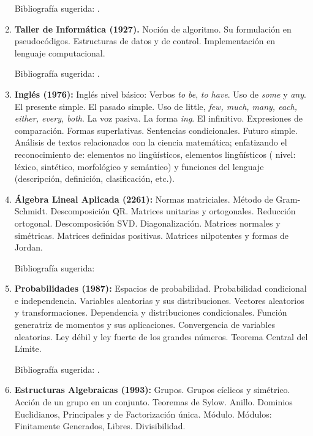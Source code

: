 \documentclass[a4paper, 12pt]{article}
\begin{document}
\begin{enumerate}
Bibliografía sugerida: \cite{ marsdentromba,MarianoGiaquinta641,ErnstHairer633,PeterD.Lax632}.


\item \textbf{Taller de Informática (1927).} Noción de algoritmo. Su formulación en pseudocódigos. Estructuras de datos y de control. Implementación
en lenguaje computacional.

Bibliografía sugerida: \cite{Seroul:2000,Rose:2015}.









\item\textbf{Inglés (1976):} Inglés nivel básico: Verbos \emph{to be}, \emph{to
have}. Uso de \emph{some} y \emph{any}. El presente simple. El
pasado simple. Uso de little, \emph{few, much, many, each, either,
every, both}. La voz pasiva. La forma \emph{ing}. El infinitivo.
Expresiones de comparación. Formas superlativas. Sentencias
condicionales. Futuro simple.  Análisis de textos relacionados con la
ciencia matemática; enfatizando el reconocimiento de: elementos no
ling\"{u}ísticos, elementos ling\"{u}ísticos ( nivel: léxico,
sintético, morfológico y semántico) y funciones del lenguaje
(descripción, definición, clasificación, etc.).


\item\textbf{Álgebra Lineal Aplicada (2261):}  Normas matriciales.
Método de Gram-Schmidt. Descomposición QR.
Matrices unitarias y ortogonales. Reducción ortogonal.
Descomposición SVD. Diagonalización. Matrices normales y simétricas. Matrices
definidas positivas. Matrices nilpotentes y formas de Jordan.

 Bibliografía sugerida: \cite{golub,hoffman,meyer, strang}


\item \textbf{Probabilidades (1987):} Espacios de probabilidad.  Probabilidad
condicional e independencia.  Variables aleatorias y sus distribuciones.  Vectores aleatorios y transformaciones.  Dependencia y distribuciones condicionales. Función generatriz de momentos y sus aplicaciones. Convergencia de variables aleatorias. Ley débil y ley fuerte de
los grandes números. Teorema Central del Límite. 

Bibliografía sugerida: \cite{berts, parzen, ross, grimmet}. 

\item \textbf{Estructuras Algebraicas  (1993):} Grupos. Grupos cíclicos y
simétrico. Acción de un grupo en un conjunto. Teoremas de Sylow.
Anillo. Dominios Euclidianos, Principales y de Factorización
única. Módulo. Módulos: Finitamente Generados, Libres.
Divisibilidad.


\end{enumerate}
\end{document}
